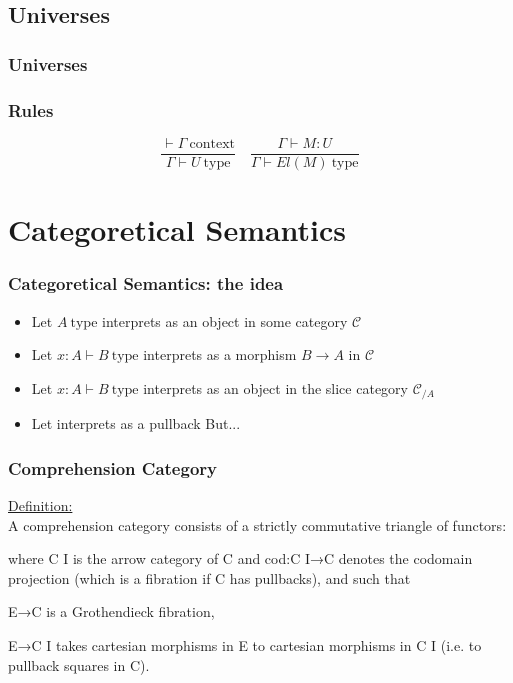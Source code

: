 \documentclass{beamer}
\newcommand{\cntxt}{\ \mathrm{context}}
\newcommand{\typ}{\ \mathrm{type}}
\begin{document}
    \subsection{Universes}
    \begin{frame}
        \frametitle{Universes}    
    \end{frame}
    \begin{frame}
        \frametitle{Rules}
        $$\frac{\vdash \Gamma \cntxt}{\Gamma \vdash U \typ}\quad\frac{\Gamma \vdash M:U}{\Gamma\vdash El(M)\typ}$$
    \end{frame}
    \section{Categoretical Semantics}
    \begin{frame}
        \frametitle{Categoretical Semantics: the idea}
        \begin{itemize}
            \item Let $A \typ$ interprets as an object in some category $\mathcal{C}$
            \item Let $x: A \vdash B \typ$ interprets as a morphism $B \rightarrow A$ in $\mathcal{C}$
            \item Let $x: A \vdash B \typ$ interprets as an object in the slice category $\mathcal{C}_{/A}$
            \item Let interprets as a pullback
            But...
        \end{itemize}
    \end{frame}
    \begin{frame}
        \frametitle{Comprehension Category}
        \underline{Definition:}\\
        A comprehension category consists of a strictly commutative triangle of functors:
        \begin{center}
        \end{center}
        where C I is the arrow category of C and cod:C I→C denotes the codomain projection (which is a fibration if C has pullbacks), and such that

    E→C is a Grothendieck fibration,

    E→C I takes cartesian morphisms in E to cartesian morphisms in C I (i.e. to pullback squares in C).
    \end{frame}
\end{document}
